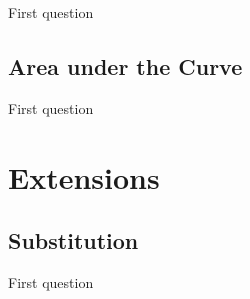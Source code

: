 \documentclass[a4paper,12pt,oneside]{exam}
\begin{document}
\begin{questions}
\question First question
\end{questions}

\subsection{Area under the Curve}

\begin{questions}
\question First question
\end{questions}

\newpage
\section{Extensions}

\subsection{Substitution}

\begin{questions}
\question First question
\end{questions}
\end{document}
